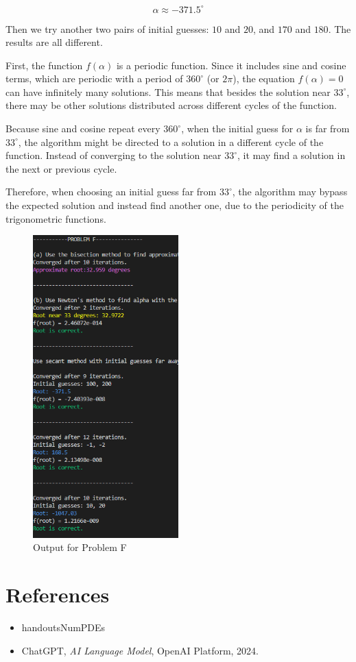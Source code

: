 \documentclass[a4paper]{article}
\begin{document}
\[
\alpha \approx -371.5^\circ
\]

Then we try another two pairs of initial guesses: \( 10 \) and \( 20 \), and \( 170 \) and \( 180 \). The results are all different. 

First, the function \( f(\alpha) \) is a periodic function. Since it includes sine and cosine terms, which are periodic with a period of \( 360^\circ \) (or \( 2\pi \)), the equation \( f(\alpha) = 0 \) can have infinitely many solutions. This means that besides the solution near \( 33^\circ \), there may be other solutions distributed across different cycles of the function.

Because sine and cosine repeat every \( 360^\circ \), when the initial guess for \( \alpha \) is far from \( 33^\circ \), the algorithm might be directed to a solution in a different cycle of the function. Instead of converging to the solution near \( 33^\circ \), it may find a solution in the next or previous cycle.

Therefore, when choosing an initial guess far from \( 33^\circ \), the algorithm may bypass the expected solution and instead find another one, due to the periodicity of the trigonometric functions.

\begin{figure}[H]  
  \centering
  \includegraphics[width=0.5\textwidth]{./picture/ProblemF.png}
  \caption{Output for Problem F}
\end{figure}


\section{References}
\begin{itemize}
   \item handoutsNumPDEs
   \item ChatGPT, \textit{AI Language Model}, OpenAI Platform, 2024.
\end{itemize}
\end{document}
